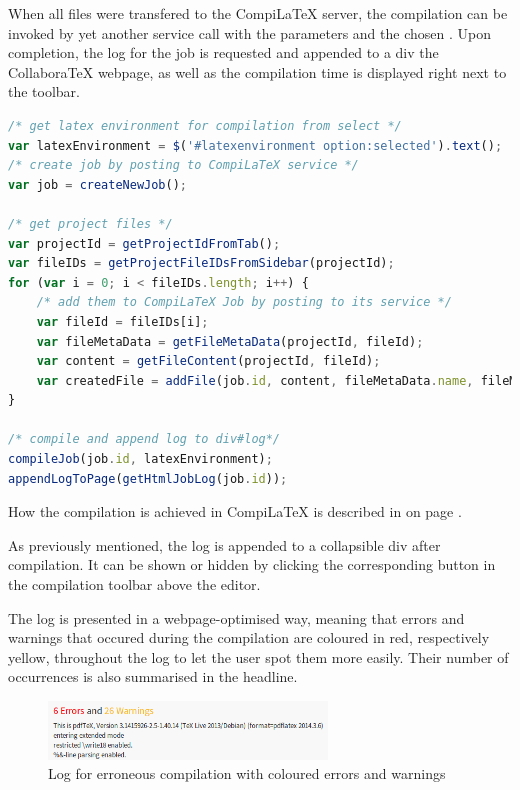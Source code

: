 When all files were transfered to the CompiLaTeX server, the compilation can be invoked by yet another service call with the parameters  and the chosen . Upon completion, the log for the job is requested and appended to a div the CollaboraTeX webpage, as well as the compilation time is displayed right next to the toolbar.

\begin{lstlisting}[language=JavaScript, caption=Click Listener for the Compilation Button in CollaboraTeX]
/* get latex environment for compilation from select */
var latexEnvironment = $('#latexenvironment option:selected').text();
/* create job by posting to CompiLaTeX service */
var job = createNewJob();

/* get project files */
var projectId = getProjectIdFromTab();
var fileIDs = getProjectFileIDsFromSidebar(projectId);
for (var i = 0; i < fileIDs.length; i++) {
	/* add them to CompiLaTeX Job by posting to its service */
    var fileId = fileIDs[i];
    var fileMetaData = getFileMetaData(projectId, fileId);
    var content = getFileContent(projectId, fileId);
    var createdFile = addFile(job.id, content, fileMetaData.name, fileMetaData.mainTex);
}

/* compile and append log to div#log*/
compileJob(job.id, latexEnvironment);
appendLogToPage(getHtmlJobLog(job.id));
\end{lstlisting}

How the compilation is achieved in CompiLaTeX is described in  on page \pageref{subsubsec:compilatex-implementation}.


As previously mentioned, the log is appended to a collapsible div after compilation. It can be shown or hidden by clicking the corresponding button in the compilation toolbar above the editor.

The log is presented in a webpage-optimised way, meaning that errors and warnings that occured during the compilation are coloured in red, respectively yellow, throughout the log to let the user spot them more easily. Their number of occurrences is also summarised in the headline.

\begin{figure}[H]
	\centering
		\includegraphics[width=0.66\textwidth]{images/screenshot-compile-log-warning.png}
	\caption{Log for erroneous compilation with coloured errors and warnings}
\end{figure}

